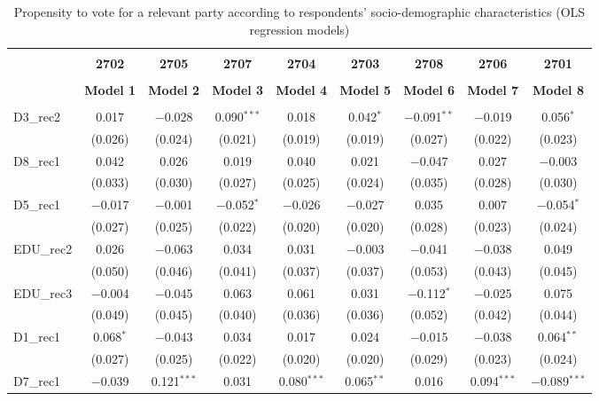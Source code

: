 \documentclass[
]{article}
\begin{document}
\begin{table}[!htbp] \centering 
  \caption{Propensity to vote for a relevant party according to respondents' 
                     socio-demographic characteristics (OLS regression models)} 
  \label{table:full_ols_se} 
\begin{tabular}{@{\extracolsep{5pt}}lcccccccc} 
\\[-1.8ex]\hline \\[-1.8ex] 
 & \textbf{2702} & \textbf{2705} & \textbf{2707} & \textbf{2704} & \textbf{2703} & \textbf{2708} & \textbf{2706} & \textbf{2701} \\ 
\\[-1.8ex] & \textbf{Model 1} & \textbf{Model 2} & \textbf{Model 3} & \textbf{Model 4} & \textbf{Model 5} & \textbf{Model 6} & \textbf{Model 7} & \textbf{Model 8}\\ 
\hline \\[-1.8ex] 
 D3\_rec2 & 0.017 & $-$0.028 & 0.090$^{***}$ & 0.018 & 0.042$^{*}$ & $-$0.091$^{**}$ & $-$0.019 & 0.056$^{*}$ \\ 
  & (0.026) & (0.024) & (0.021) & (0.019) & (0.019) & (0.027) & (0.022) & (0.023) \\ 
  D8\_rec1 & 0.042 & 0.026 & 0.019 & 0.040 & 0.021 & $-$0.047 & 0.027 & $-$0.003 \\ 
  & (0.033) & (0.030) & (0.027) & (0.025) & (0.024) & (0.035) & (0.028) & (0.030) \\ 
  D5\_rec1 & $-$0.017 & $-$0.001 & $-$0.052$^{*}$ & $-$0.026 & $-$0.027 & 0.035 & 0.007 & $-$0.054$^{*}$ \\ 
  & (0.027) & (0.025) & (0.022) & (0.020) & (0.020) & (0.028) & (0.023) & (0.024) \\ 
  EDU\_rec2 & 0.026 & $-$0.063 & 0.034 & 0.031 & $-$0.003 & $-$0.041 & $-$0.038 & 0.049 \\ 
  & (0.050) & (0.046) & (0.041) & (0.037) & (0.037) & (0.053) & (0.043) & (0.045) \\ 
  EDU\_rec3 & $-$0.004 & $-$0.045 & 0.063 & 0.061 & 0.031 & $-$0.112$^{*}$ & $-$0.025 & 0.075 \\ 
  & (0.049) & (0.045) & (0.040) & (0.036) & (0.036) & (0.052) & (0.042) & (0.044) \\ 
  D1\_rec1 & 0.068$^{*}$ & $-$0.043 & 0.034 & 0.017 & 0.024 & $-$0.015 & $-$0.038 & 0.064$^{**}$ \\ 
  & (0.027) & (0.025) & (0.022) & (0.020) & (0.020) & (0.029) & (0.023) & (0.024) \\ 
  D7\_rec1 & $-$0.039 & 0.121$^{***}$ & 0.031 & 0.080$^{***}$ & 0.065$^{**}$ & 0.016 & 0.094$^{***}$ & $-$0.089$^{***}$ \\ 

\end{tabular}
\end{table}
\end{document}
